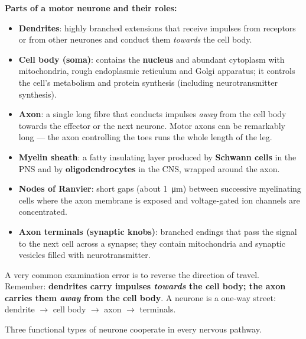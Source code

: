 \documentclass[11pt]{article}
\newcounter{popsec}
\newcounter{popsub}
\newcommand{\courssub}[1]{%
  \stepcounter{popsub}%
  \par\vspace{9pt}\noindent{\popxbold\fontsize{11.5}{13}\selectfont\color{popink}{\color{poporange}\thepopsec.\thepopsub}\hspace{6pt}#1}\par\nopagebreak\vspace{4pt}
}
\begin{document}
\textbf{Parts of a motor neurone and their roles:}
\begin{itemize}
\item \textbf{Dendrites}: highly branched extensions that receive impulses from receptors or from other neurones and conduct them \emph{towards} the cell body.
\item \textbf{Cell body (soma)}: contains the \textbf{nucleus} and abundant cytoplasm with mitochondria, rough endoplasmic reticulum and Golgi apparatus; it controls the cell's metabolism and protein synthesis (including neurotransmitter synthesis).
\item \textbf{Axon}: a single long fibre that conducts impulses \emph{away} from the cell body towards the effector or the next neurone. Motor axons can be remarkably long — the axon controlling the toes runs the whole length of the leg.
\item \textbf{Myelin sheath}: a fatty insulating layer produced by \textbf{Schwann cells} in the PNS and by \textbf{oligodendrocytes} in the CNS, wrapped around the axon.
\item \textbf{Nodes of Ranvier}: short gaps (about \SI{1}{\micro m}) between successive myelinating cells where the axon membrane is exposed and voltage-gated ion channels are concentrated.
\item \textbf{Axon terminals (synaptic knobs)}: branched endings that pass the signal to the next cell across a synapse; they contain mitochondria and synaptic vesicles filled with neurotransmitter.
\end{itemize}

\begin{attention}
A very common examination error is to reverse the direction of travel. Remember: \textbf{dendrites carry impulses \emph{towards} the cell body; the axon carries them \emph{away} from the cell body}. A neurone is a one-way street: dendrite $\rightarrow$ cell body $\rightarrow$ axon $\rightarrow$ terminals.
\end{attention}

\courssub{Types of Neurones}

Three functional types of neurone cooperate in every nervous pathway.
\end{document}

